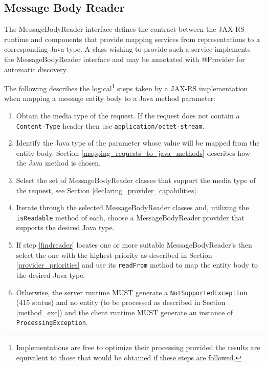 \subsection{Message Body Reader}
\label{message_body_reader}

The MessageBodyReader interface defines the contract between the JAX-RS runtime and components that provide mapping
services from representations to a corresponding Java type. A class wishing to provide such a service implements the
MessageBodyReader interface and may be annotated with @Provider for automatic discovery.

The following describes the logical\footnote{Implementations are free to optimize their processing provided the results
are equivalent to those that would be obtained if these steps are followed.} steps taken by a JAX-RS implementation when
mapping a message entity body to a Java method parameter:

\begin{enumerate}
    \item Obtain the media type of the request. If the request does not contain a \lstinline{Content-Type} header then
    use
    \lstinline{application/octet-stream}.
    \item Identify the Java type of the parameter whose value will be mapped from the entity body.
    Section \ref{mapping_requests_to_java_methods} describes how the Java method is chosen.
    \item Select the set of MessageBodyReader classes that support the media type of the request, see
    Section \ref{declaring_provider_capabilities}.
    \item\label{findreader} Iterate through the selected MessageBodyReader classes and, utilizing the
    \lstinline{isReadable} method of each, choose a MessageBodyReader provider that supports the desired Java type.
    \item If step \ref{findreader} locates one or more suitable MessageBodyReader's then select the one with the highest
    priority as described in Section \ref{provider_priorities} and use its \lstinline{readFrom} method to map the
    entity body to the desired Java type.
    \item Otherwise, the server runtime MUST generate a \lstinline{NotSupportedException} (415 status) and no entity (to
    be processed as described in Section \ref{method_exc}) and the client runtime MUST generate an instance of
    \lstinline{ProcessingException}.
\end{enumerate}

